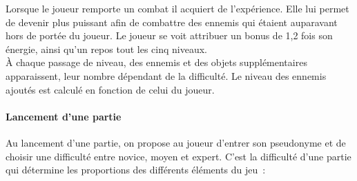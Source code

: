 \documentclass[11pt]{article}
\begin{document}
Lorsque le joueur remporte un combat il acquiert de l’expérience. Elle lui permet de devenir plus puissant afin de combattre des ennemis qui étaient auparavant hors de portée du joueur.
Le joueur se voit attribuer un bonus de 1,2 fois son énergie, ainsi qu'un repos tout les cinq niveaux.\\
À chaque passage de niveau, des ennemis et des objets supplémentaires apparaissent, leur nombre dépendant de la difficulté. Le niveau des ennemis ajoutés est calculé en fonction de celui du joueur.


\paragraph{Lancement d'une partie}

Au lancement d'une partie, on propose au joueur d'entrer son pseudonyme et de choisir une difficulté entre novice, moyen et expert. C'est la difficulté d'une partie qui détermine les proportions des différents éléments du jeu~:
\end{document}
